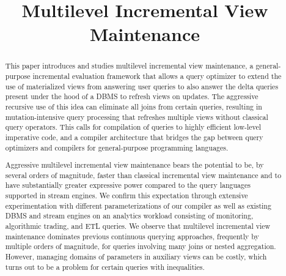 \documentclass{sig-alternate}
\title{Multilevel Incremental View Maintenance}
\author{
}
\newcommand{\comment}[1]{}
\begin{document}
\maketitle


\begin{abstract}
This paper introduces and studies multilevel incremental view maintenance,
a general-purpose incremental
evaluation framework that allows a query optimizer to extend the use of
materialized views from answering user queries to also answer the delta
queries present under the hood of a DBMS to refresh views on updates. The
aggressive recursive use of this idea can eliminate all joins from certain
queries, resulting in mutation-intensive query processing that refreshes
multiple views without classical query operators. This calls for compilation of
queries to highly efficient low-level imperative code, and a compiler
architecture that bridges the gap between query optimizers and compilers for
general-purpose programming languages.


\comment{
Multilevel incremental view maintenance generalizes the idea of using
materialized views for query answering by allowing a query optimizer to use
materialized views for also answering delta queries, which are the auxiliary
queries that are used in incremental view maintenance to refresh materialized
views when updates happen. Aggressive recursive use of this idea allows to
eliminate all joins from certain queries and to generate highly efficient
low-level code without classical query operators that performs all query
evaluation and view refreshment work. This calls for the compilation of queries.

In this paper, we present a general compiler architecture for languages such as
SQL. To realize such a compiler, we overcome the challenges of materializing
views with binding patterns (parameters) to support arbitrarily nested queries
with aggregates, complex patterns of side effects that may arise, and the need
to perform sophisticated forms of deforestation and fusion frequently employed
in compilers but almost unknown in the database literature.
}

Aggressive multilevel incremental view maintenance bears the potential to be, by
several orders of magnitude, faster than classical incremental view
maintenance and to have substantially greater expressive power compared to the query
languages supported in stream engines.
%
%
We confirm this expectation through extensive experimentation with different
parameterizations of our compiler as well as existing DBMS and stream engines
on an analytics workload consisting of monitoring, algorithmic trading, and ETL
queries. We observe that multilevel incremental view maintenance dominates
previous continuous querying approaches, frequently by multiple orders of
magnitude, for queries involving many joins or nested aggregation. However,
managing domains of parameters in auxiliary views can be costly, which turns out
to be a problem for certain queries with inequalities.
\end{abstract}
\end{document}
